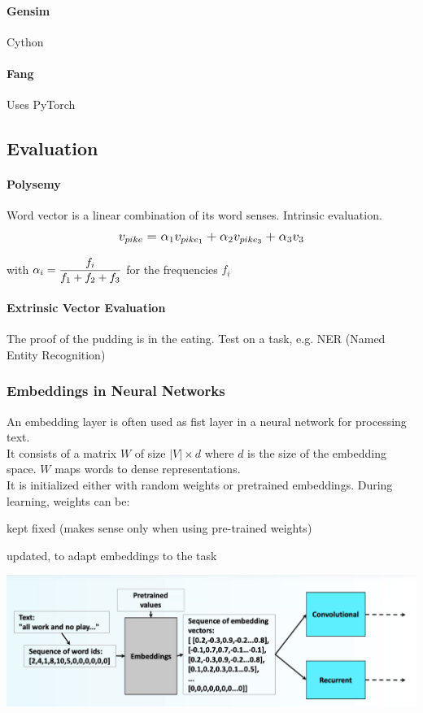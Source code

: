 \documentclass[10pt]{report}
\begin{document}
\paragraph{Gensim} Cython
\paragraph{Fang} Uses PyTorch
\subsection{Evaluation}
\paragraph{Polysemy} Word vector is a linear combination of its word senses. Intrinsic evaluation.
$$\mathlarger{v_{pike} = \alpha_1v_{pike_1} + \alpha_2v_{pike_3} + \alpha_3v_3}$$
\begin{center}
with $\alpha_i = \mathlarger{\frac{f_i}{f_1+f_2+f_3}}$ for the frequencies $f_i$
\end{center}
\paragraph{Extrinsic Vector Evaluation} The proof of the pudding is in the eating. Test on a task, e.g. NER (Named Entity Recognition)
\subsubsection{Embeddings in Neural Networks} An embedding layer is often used as fist layer in a neural network for processing text.\\
It consists of a matrix $W$ of size $|V|\times d$ where $d$ is the size of the embedding space. $W$ maps words to dense representations.\\
It is initialized either with random weights or pretrained embeddings. During learning, weights can be:
\begin{list}{}{}
	\item kept fixed (makes sense only when using pre-trained weights)
	\item updated, to adapt embeddings to the task
\end{list}
\begin{center}
	\includegraphics[scale=0.5]{7.png}
\end{center}
\end{document}
